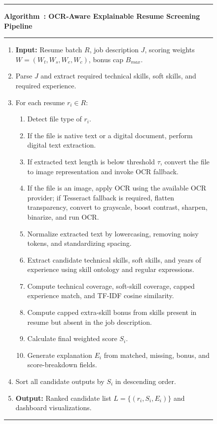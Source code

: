 \documentclass[conference]{IEEEtran}
\newcounter{algorithm}
\begin{document}
\begin{figure}[t]
\hrule
\vspace{3pt}
\label{alg:endtoend}
\textbf{Algorithm~\thealgorithm: OCR-Aware Explainable Resume Screening Pipeline}
\vspace{3pt}
\hrule
\vspace{4pt}
\begin{enumerate}
    \item \textbf{Input:} Resume batch \(R\), job description \(J\), scoring weights \(W=(W_t,W_s,W_e,W_c)\), bonus cap \(B_{max}\).
    \item Parse \(J\) and extract required technical skills, soft skills, and required experience.
    \item For each resume \(r_i \in R\):
    \begin{enumerate}
        \item Detect file type of \(r_i\).
        \item If the file is native text or a digital document, perform digital text extraction.
        \item If extracted text length is below threshold \(\tau\), convert the file to image representation and invoke OCR fallback.
        \item If the file is an image, apply OCR using the available OCR provider; if Tesseract fallback is required, flatten transparency, convert to grayscale, boost contrast, sharpen, binarize, and run OCR.
        \item Normalize extracted text by lowercasing, removing noisy tokens, and standardizing spacing.
        \item Extract candidate technical skills, soft skills, and years of experience using skill ontology and regular expressions.
        \item Compute technical coverage, soft-skill coverage, capped experience match, and TF-IDF cosine similarity.
        \item Compute capped extra-skill bonus from skills present in resume but absent in the job description.
        \item Calculate final weighted score \(S_i\).
        \item Generate explanation \(E_i\) from matched, missing, bonus, and score-breakdown fields.
    \end{enumerate}
    \item Sort all candidate outputs by \(S_i\) in descending order.
    \item \textbf{Output:} Ranked candidate list \(L=\{(r_i,S_i,E_i)\}\) and dashboard visualizations.
\end{enumerate}
\vspace{2pt}
\hrule
\end{figure}
\end{document}
